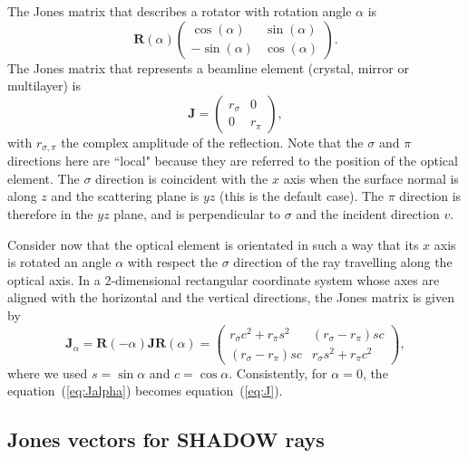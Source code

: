 \documentclass{iucr}
\begin{document}
The Jones matrix that describes a rotator with rotation angle $\alpha$ is
\begin{equation}
\textbf{R}(\alpha)
\begin{pmatrix}
\cos(\alpha) & \sin(\alpha)\\
-\sin(\alpha) & \cos(\alpha)
\end{pmatrix}.
\end{equation}
The Jones matrix that represents a beamline element (crystal, mirror or multilayer) is
\begin{equation}\label{eq:J}
\textbf{J} = 
\begin{pmatrix}
r_\sigma & 0\\
0 & r_\pi
\end{pmatrix},
\end{equation}
with $r_{\sigma,\pi}$ the complex amplitude of the reflection.
Note that the $\sigma$ and $\pi$ directions here are ``local" because they are referred to the position of the optical element. The $\sigma$ direction is coincident with the $x$ axis when the surface normal is along $z$ and the scattering plane is $yz$ (this is the default case). The $\pi$ direction is therefore in the $yz$ plane, and is perpendicular to $\sigma$ and the incident direction $v$.

Consider now that the optical element is orientated in such a way that its $x$ axis is rotated an angle $\alpha$ with respect the $\sigma$ direction of the ray travelling along the optical axis. In a 2-dimensional rectangular coordinate system whose axes are aligned with the horizontal and the vertical directions, the Jones matrix is given by
\begin{equation}\label{eq:Jalpha}
    \textbf{J}_\alpha = \textbf{R}(-\alpha) \textbf{J} \textbf{R}(\alpha)=
    \begin{pmatrix}
r_\sigma c^2 + r_\pi s^2 & (r_\sigma-r_\pi) s c\\
(r_\sigma - r_\pi) s c& 
r_\sigma s^2 + r_\pi c^2
\end{pmatrix},
\end{equation}
where we used $s=\sin\alpha$ and $c=\cos\alpha$. Consistently, for $\alpha=0$, the equation~(\ref{eq:Jalpha}) becomes equation~(\ref{eq:J}).

\subsection{Jones vectors for SHADOW rays}
\label{sec:JonesAndShadow}
\end{document}
